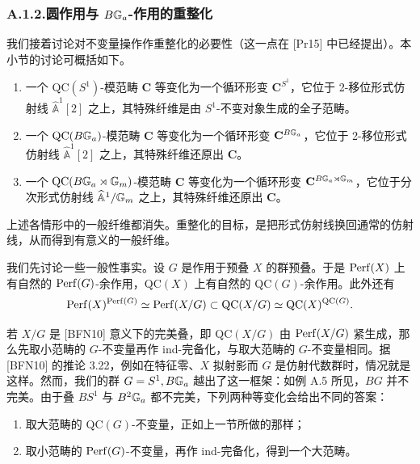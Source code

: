 
\subsubsection*{A.1.2.\quad 圆作用与 $B\mathbb{G}_a$-作用的重整化}

我们接着讨论对不变量操作作重整化的必要性（这一点在 [Pr15] 中已经提出）。本小节的讨论可概括如下。
\begin{enumerate}[(1)]
\item 一个 $\mathrm{QC}(S^1)$-模范畴 $\mathbf C$ 等变化为一个循环形变 $\mathbf C^{S^1}$，它位于 2-移位形式仿射线 $\widehat{\mathbb A}^1[2]$ 之上，其特殊纤维是由 $S^1$-不变对象生成的全子范畴。
\item 一个 $\mathrm{QC}(B\mathbb{G}_a)$-模范畴 $\mathbf C$ 等变化为一个循环形变 $\mathbf C^{B\mathbb{G}_a}$，它位于 2-移位形式仿射线 $\widehat{\mathbb A}^1[2]$ 之上，其特殊纤维还原出 $\mathbf C$。
\item 一个 $\mathrm{QC}(B\mathbb{G}_a\rtimes\mathbb{G}_m)$-模范畴 $\mathbf C$ 等变化为一个循环形变 $\mathbf C^{B\mathbb{G}_a\rtimes\mathbb{G}_m}$，它位于分次形式仿射线 $\widehat{\mathbb A}^1/\mathbb{G}_m$ 之上，其特殊纤维还原出 $\mathbf C$。
\end{enumerate}

上述各情形中的一般纤维都消失。重整化的目标，是把形式仿射线换回通常的仿射线，从而得到有意义的一般纤维。

我们先讨论一些一般性事实。设 $G$ 是作用于预叠 $X$ 的群预叠。于是 $\operatorname{Perf}(X)$ 上有自然的 $\operatorname{Perf}(G)$-余作用，$\mathrm{QC}(X)$ 上有自然的 $\mathrm{QC}(G)$-余作用。此外还有
\[
\operatorname{Perf}(X)^{\operatorname{Perf}(G)}\simeq\operatorname{Perf}(X/G)\subset\mathrm{QC}(X/G)\simeq\mathrm{QC}(X)^{\mathrm{QC}(G)}.
\]

若 $X/G$ 是 [BFN10] 意义下的完美叠，即 $\mathrm{QC}(X/G)$ 由 $\operatorname{Perf}(X/G)$ 紧生成，那么先取小范畴的 $G$-不变量再作 ind-完备化，与取大范畴的 $G$-不变量相同。据 [BFN10] 的推论 3.22，例如在特征零、$X$ 拟射影而 $G$ 是仿射代数群时，情况就是这样。然而，我们的群 $G=S^1,B\mathbb{G}_a$ 越出了这一框架：如例 A.5 所见，$BG$ 并不完美。由于叠 $BS^1$ 与 $B^2\mathbb{G}_a$ 都不完美，下列两种等变化会给出不同的答案：
\begin{enumerate}[(1)]
\item 取大范畴的 $\mathrm{QC}(G)$-不变量，正如上一节所做的那样；
\item 取小范畴的 $\operatorname{Perf}(G)$-不变量，再作 ind-完备化，得到一个大范畴。
\end{enumerate}

